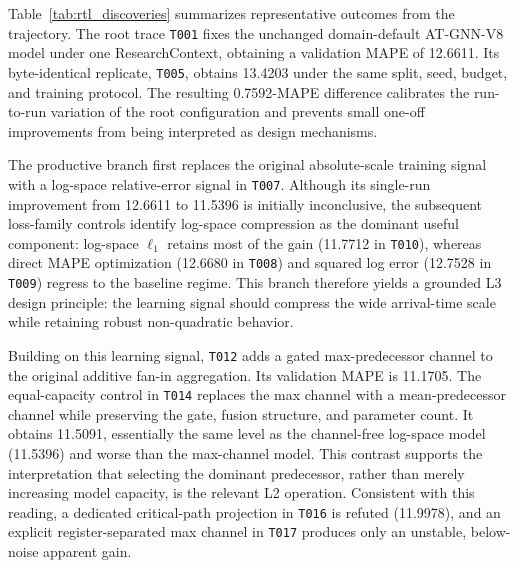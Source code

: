 Table~\ref{tab:rtl_discoveries} summarizes representative outcomes from the trajectory. The root trace
\texttt{T001} fixes the unchanged domain-default AT-GNN-V8 model under one
ResearchContext, obtaining a validation MAPE of 12.6611. Its byte-identical
replicate, \texttt{T005}, obtains 13.4203 under the same split, seed, budget,
and training protocol. The resulting 0.7592-MAPE difference calibrates the
run-to-run variation of the root configuration and prevents small one-off
improvements from being interpreted as design mechanisms.


The productive branch first replaces the original absolute-scale training
signal with a log-space relative-error signal in \texttt{T007}. Although its
single-run improvement from 12.6611 to 11.5396 is initially inconclusive,
the subsequent loss-family controls identify log-space compression as the
dominant useful component: log-space $\ell_1$ retains most of the gain
(11.7712 in \texttt{T010}), whereas direct MAPE optimization (12.6680 in
\texttt{T008}) and squared log error (12.7528 in \texttt{T009}) regress to the
baseline regime. This branch therefore yields a grounded L3 design principle:
the learning signal should compress the wide arrival-time scale while retaining
robust non-quadratic behavior.

Building on this learning signal, \texttt{T012} adds a gated max-predecessor
channel to the original additive fan-in aggregation. Its validation MAPE is
11.1705. The equal-capacity control in \texttt{T014} replaces the max channel
with a mean-predecessor channel while preserving the gate, fusion structure,
and parameter count. It obtains 11.5091, essentially the same level as the
channel-free log-space model (11.5396) and worse than the max-channel model.
This contrast supports the interpretation that selecting the dominant
predecessor, rather than merely increasing model capacity, is the relevant L2
operation. Consistent with this reading, a dedicated critical-path projection
in \texttt{T016} is refuted (11.9978), and an explicit register-separated max
channel in \texttt{T017} produces only an unstable, below-noise apparent gain.

